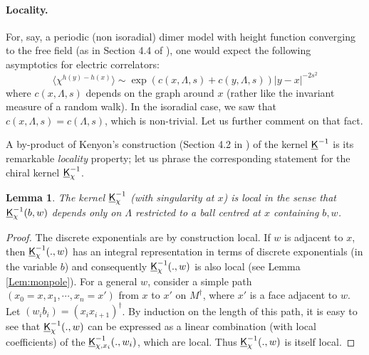 \documentclass[10pt]{article}
\newcommand{\uK}{{\underline {\sf K}}}
\newcommand{\dg}{\dagger}
\newtheorem{Lem}[thm]{Lemma}
\begin{document}
\paragraph{Locality.\\}

%

For, say, a periodic (non isoradial) dimer model with height function converging to the free field (as in Section 4.4 of \cite{KOS}), one would expect the following asymptotics for electric correlators:
$$\langle\chi^{h(y)-h(x)}\rangle\sim\exp(c(x,\Lambda,s)+c(y,\Lambda,s))|y-x|^{-2s^2}$$
where $c(x,\Lambda,s)$ depends on the graph around $x$ (rather like the invariant measure of a random walk). In the isoradial case, we saw that $c(x,\Lambda,s)=c(\Lambda,s)$, which is non-trivial. Let us further comment on that fact.


A by-product of Kenyon's construction (Section 4.2 in \cite{Ken_isoradial}) of the kernel $\uK^{-1}$ is its remarkable {\em locality} property; let us phrase the corresponding statement for the chiral kernel $\uK_\chi^{-1}$.

\begin{Lem}
The kernel $\uK_{\chi}^{-1}$ (with singularity at $x$) is {\em local} in the sense that $\uK_{\chi}^{-1}(b,w)$ depends only on $\Lambda$ restricted to a ball centred at $x$ containing $b,w$.
\end{Lem}
\begin{proof}
The discrete exponentials are by construction local. If $w$ is adjacent to $x$, then $\uK_{\chi}^{-1}(.,w)$ has an integral representation in terms of discrete exponentials (in the variable $b$) and consequently $\uK_\chi^{-1}(.,w)$ is also local (see Lemma \ref{Lem:monpole}). For a general $w$, consider a simple path $(x_0=x,x_1,\cdots,x_n=x')$ from $x$ to $x'$ on $M^\dg$, where $x'$ is a face adjacent to $w$. Let $(w_ib_i)=(x_ix_{i+1})^\dg$. By induction on the length of this path, it is easy to see that $\uK_\chi^{-1}(.,w)$ can be expressed as a linear combination (with local coefficients) of the $\uK_{\chi,x_i}^{-1}(.,w_i)$, which are local. Thus $\uK_\chi^{-1}(.,w)$ is itself local.
\end{proof}
\end{document}
